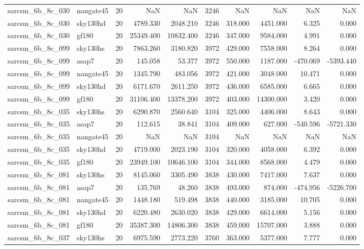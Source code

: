 \documentclass{article}
\begin{document}
\begin{longtable}{llrrrrrrrr}
sarcsm\_6b\_8c\_030 & nangate45 & 20 & NaN & NaN & 3246 & NaN & NaN & NaN & NaN \\
sarcsm\_6b\_8c\_030 & sky130hd & 20 & 4789.330 & 2048.210 & 3246 & 318.000 & 4451.000 & 6.325 & 0.000 \\
sarcsm\_6b\_8c\_030 & gf180 & 20 & 25349.400 & 10832.400 & 3246 & 347.000 & 9584.000 & 4.991 & 0.000 \\
sarcsm\_6b\_8c\_099 & sky130hs & 20 & 7863.260 & 3180.820 & 3972 & 429.000 & 7558.000 & 8.264 & 0.000 \\
sarcsm\_6b\_8c\_099 & asap7 & 20 & 145.058 & 53.377 & 3972 & 550.000 & 1187.000 & -470.069 & -5393.440 \\
sarcsm\_6b\_8c\_099 & nangate45 & 20 & 1345.790 & 483.056 & 3972 & 421.000 & 3048.000 & 10.471 & 0.000 \\
sarcsm\_6b\_8c\_099 & sky130hd & 20 & 6171.670 & 2611.250 & 3972 & 436.000 & 6585.000 & 6.665 & 0.000 \\
sarcsm\_6b\_8c\_099 & gf180 & 20 & 31106.400 & 13378.200 & 3972 & 403.000 & 14300.000 & 3.420 & 0.000 \\
sarcsm\_6b\_8c\_035 & sky130hs & 20 & 6290.870 & 2560.640 & 3104 & 325.000 & 4406.000 & 8.643 & 0.000 \\
sarcsm\_6b\_8c\_035 & asap7 & 20 & 112.615 & 38.841 & 3104 & 409.000 & 627.000 & -540.596 & -5721.330 \\
sarcsm\_6b\_8c\_035 & nangate45 & 20 & NaN & NaN & 3104 & NaN & NaN & NaN & NaN \\
sarcsm\_6b\_8c\_035 & sky130hd & 20 & 4719.000 & 2023.190 & 3104 & 320.000 & 4058.000 & 6.392 & 0.000 \\
sarcsm\_6b\_8c\_035 & gf180 & 20 & 23949.100 & 10646.100 & 3104 & 344.000 & 8568.000 & 4.479 & 0.000 \\
sarcsm\_6b\_8c\_081 & sky130hs & 20 & 8145.060 & 3305.490 & 3838 & 430.000 & 7417.000 & 7.637 & 0.000 \\
sarcsm\_6b\_8c\_081 & asap7 & 20 & 135.769 & 48.260 & 3838 & 493.000 & 874.000 & -474.956 & -5226.700 \\
sarcsm\_6b\_8c\_081 & nangate45 & 20 & 1448.180 & 519.498 & 3838 & 440.000 & 3185.000 & 10.705 & 0.000 \\
sarcsm\_6b\_8c\_081 & sky130hd & 20 & 6220.480 & 2630.020 & 3838 & 429.000 & 6614.000 & 5.156 & 0.000 \\
sarcsm\_6b\_8c\_081 & gf180 & 20 & 35387.300 & 14806.300 & 3838 & 459.000 & 15707.000 & 3.888 & 0.000 \\
sarcsm\_6b\_8c\_037 & sky130hs & 20 & 6975.590 & 2773.220 & 3760 & 363.000 & 5377.000 & 7.777 & 0.000 \\

\end{longtable}
\end{document}
